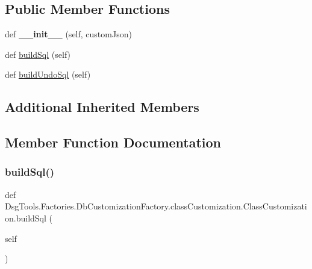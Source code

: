 \subsection*{Public Member Functions}
\begin{DoxyCompactItemize}
\item 
\mbox{\label{class_dsg_tools_1_1_factories_1_1_db_customization_factory_1_1class_customization_1_1_class_customization_a33292a2541cfeeda8bb235f8495c64da}} 
def {\bfseries \+\_\+\+\_\+init\+\_\+\+\_\+} (self, custom\+Json)
\item 
def \mbox{\hyperlink{class_dsg_tools_1_1_factories_1_1_db_customization_factory_1_1class_customization_1_1_class_customization_a94aea9d07f6b310848df7b15354dc7d6}{build\+Sql}} (self)
\item 
def \mbox{\hyperlink{class_dsg_tools_1_1_factories_1_1_db_customization_factory_1_1class_customization_1_1_class_customization_a9a43c41edc66ec706de8b6238662e90e}{build\+Undo\+Sql}} (self)
\end{DoxyCompactItemize}
\subsection*{Additional Inherited Members}


\subsection{Member Function Documentation}
\mbox{\label{class_dsg_tools_1_1_factories_1_1_db_customization_factory_1_1class_customization_1_1_class_customization_a94aea9d07f6b310848df7b15354dc7d6}} 
\subsubsection{\texorpdfstring{build\+Sql()}{buildSql()}}
{\footnotesize\ttfamily def Dsg\+Tools.\+Factories.\+Db\+Customization\+Factory.\+class\+Customization.\+Class\+Customization.\+build\+Sql (\begin{DoxyParamCaption}\item[{}]{self }\end{DoxyParamCaption})}

